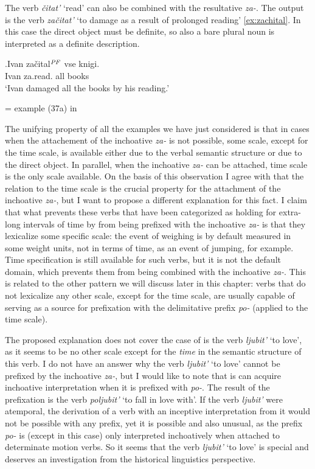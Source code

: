 The verb \textit{\v{c}itat'} `read' can also be combined with the resultative \textit{za-}. The output is the verb \textit{za\v{c}itat'} `to damage as a result of prolonged reading' \ref{ex:zachital}. In this case the direct object must be definite, so also a bare plural noun is interpreted as a definite description.

\exg.\label{ex:zachital}Ivan za\v{c}ital$^{\mathit{PF}}$ vse knigi.\\
Ivan za.read. all books\\
`Ivan damaged all the books by his reading.'
\begin{flushright}
\vspace{-0.5em}
= example (37a) in \citealt[246]{Braginsky:08}
\end{flushright}

The unifying property of all the examples we have just considered is that in cases when the attachement of the inchoative \textit{za-} is not possible, some scale, except for the time scale, is available either due to the verbal semantic structure or due to the direct object. In parallel, when the inchoative \textit{za-} can be attached, time scale is the only scale available. On the basis of this observation I agree with \citet{Paducheva:96} that the relation to the time scale is the crucial property for the attachment of the inchoative \textit{za-}, but I want to propose a different explanation for this fact. I claim that what prevents these verbs that have been categorized as holding for extra-long intervals of time by \citet{Paducheva:96} from being prefixed with the inchoative \textit{za-} is that they lexicalize some specific scale: the event of weighing is by default measured in some weight units, not in terms of time, as an event of jumping, for example. Time specification is still available for such verbs, but it is not the default domain, which prevents them from being combined with the inchoative \textit{za-}. This is related to the other pattern we will discuss later in this chapter: verbs that do not lexicalize any other scale, except for the time scale, are usually capable of serving as a source for prefixation with the delimitative prefix \textit{po-} (applied to the time scale). 

The proposed explanation does not cover the case of is the verb \textit{ljubit'} `to love', as it seems to be no other scale except for the \textit{time} in the semantic structure of this verb. I do not have an answer why the verb \textit{ljubit'} `to love' cannot be prefixed by the inchoative \textit{za-}, but I would like to note that is can acquire inchoative interpretation when it is prefixed with \textit{po-}. The result of the prefixation is the verb \textit{poljubit'} `to fall in love with'. If the verb \textit{ljubit'} were atemporal, the derivation of a verb with an inceptive interpretation from it would not be possible with any prefix, yet it is possible and also unusual, as the prefix \textit{po-} is (except in this case) only interpreted inchoatively when attached to determinate motion verbs. So it seems that the verb \textit{ljubit'} `to love' is special and deserves an investigation from the historical linguistics perspective. 


